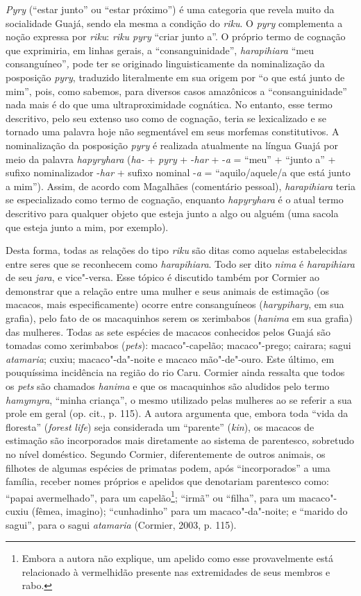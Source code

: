 \emph{Pyry} (``estar junto'' ou ``estar próximo'') é uma categoria que
revela muito da socialidade Guajá, sendo ela mesma a condição do
\emph{riku}. O \emph{pyry} complementa a noção expressa por \emph{riku}:
\emph{riku pyry} ``criar junto a''. O próprio termo de cognação que
exprimiria, em linhas gerais, a ``consanguinidade'', \emph{harapihiara}
``meu consanguíneo''\emph{,} pode ter se originado linguisticamente da
nominalização da posposição \emph{pyry}, traduzido literalmente em sua
origem por ``o que está junto de mim'', pois, como sabemos, para diversos
casos amazônicos a ``consanguinidade'' nada mais é do que uma
ultraproximidade cognática. No entanto, esse termo descritivo, pelo seu
extenso uso como de cognação, teria se lexicalizado e se tornado uma
palavra hoje não segmentável em seus morfemas constitutivos. A
nominalização da posposição \emph{pyry} é realizada atualmente na língua
Guajá por meio da palavra \emph{hapyryhara} (\emph{ha-} + \emph{pyry} +
-\emph{har} + -\emph{a} = ``meu'' + ``junto a'' + sufixo nominalizador
-\emph{har} + sufixo nominal -\emph{a} = ``aquilo/aquele/a que
está junto a mim''). Assim, de acordo com Magalhães (comentário
pessoal), \emph{harapihiara} teria se especializado como termo de
cognação, enquanto \emph{hapyryhara} é o atual termo descritivo para
qualquer objeto que esteja junto a algo ou alguém (uma sacola que esteja
junto a mim, por exemplo).

Desta forma, todas as relações do tipo \emph{riku} são ditas como
aquelas estabelecidas entre seres que se reconhecem como
\emph{harapihiara}. Todo ser dito \emph{nima} é \emph{harapihiara} de
seu \emph{jara}, e vice"-versa. Esse tópico é discutido também por
Cormier ao demonstrar que a relação entre uma mulher e seus animais de
estimação (os macacos, mais especificamente) ocorre entre consanguíneos
(\emph{harypihary}, em sua grafia), pelo fato de os macaquinhos serem os
xerimbabos (\emph{hanima} em sua grafia) das mulheres. Todas as sete
espécies de macacos conhecidos pelos Guajá são tomadas como xerimbabos
(\emph{pets}): macaco"-capelão; macaco"-prego; cairara; sagui
\emph{atamaria}; cuxiu; macaco"-da"-noite e macaco mão"-de"-ouro. Este
último, em pouquíssima incidência na região do rio Caru. Cormier ainda
ressalta que todos os \emph{pets} são chamados \emph{hanima} e que os
macaquinhos são aludidos pelo termo \emph{hamymyra}, ``minha criança'', o
mesmo utilizado pelas mulheres ao se referir a sua prole em geral (op.
cit., p. 115). A autora argumenta que, embora toda ``vida da floresta''
(\emph{forest} \emph{life}) seja considerada um ``parente'' (\emph{kin}),
os macacos de estimação são incorporados mais diretamente ao sistema de
parentesco, sobretudo no nível doméstico. Segundo Cormier,
diferentemente de outros animais, os filhotes de algumas espécies de
primatas podem, após ``incorporados'' a uma família, receber nomes
próprios e apelidos que denotariam parentesco como: ``papai avermelhado'',
para um capelão\footnote{Embora a autora não explique, um apelido como
  esse provavelmente está relacionado à vermelhidão presente nas
  extremidades de seus membros e rabo.}; ``irmã'' ou ``filha'', para um
macaco"-cuxiu (fêmea, imagino); ``cunhadinho'' para um macaco"-da"-noite; e
``marido do sagui'', para o sagui \emph{atamaria} (Cormier, 2003, p. 115).

